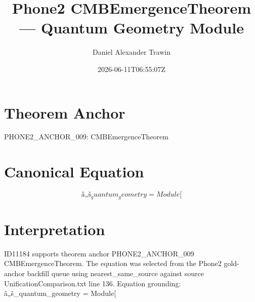 \documentclass[11pt]{article}
\title{Phone2 CMBEmergenceTheorem — Quantum Geometry Module}
\author{Daniel Alexander Trawin}
\date{2026-06-11T06:55:07Z}
\begin{document}
\maketitle
\section*{Theorem Anchor}
PHONE2_ANCHOR_009: CMBEmergenceTheorem
\section*{Canonical Equation}
\[
â„š_quantum_geometry = Module[
\]
\section*{Interpretation}
ID11184 supports theorem anchor PHONE2_ANCHOR_009 CMBEmergenceTheorem. The equation was selected from the Phone2 gold-anchor backfill queue using nearest_same_source against source UnificationComparison.txt line 136. Equation grounding: â„š_quantum_geometry = Module[
\end{document}
